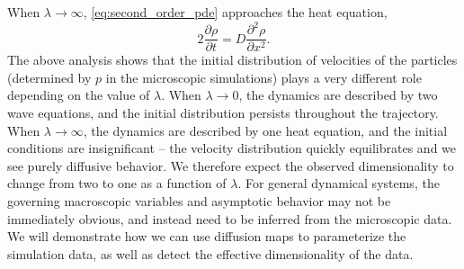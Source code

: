 \documentclass[preprint]{elsarticle}
\begin{document}
When $\lambda \rightarrow \infty$, \eqref{eq:second_order_pde} approaches the heat equation,
\begin{equation}
2 \frac{\partial \rho}{\partial t} = D \frac{\partial ^2 \rho}{\partial x^2}.
\end{equation}
%
%
The above analysis shows that the initial distribution of velocities of the particles (determined by $p$ in the microscopic simulations) plays a very different role depending on the value of $\lambda$.
%
When $\lambda \rightarrow 0$, the dynamics are described by two wave equations, and the initial distribution persists throughout the trajectory.
%
When $\lambda \rightarrow \infty$, the dynamics are described by one heat equation, and the initial conditions are insignificant -- the velocity distribution quickly equilibrates and we see purely diffusive behavior.
%
We therefore expect the observed dimensionality to change from two to one as a function of $\lambda$. 
%
For general dynamical systems, the governing macroscopic variables and asymptotic behavior may not be immediately obvious, and instead need to be inferred from the microscopic data.
%
We will demonstrate how we can use diffusion maps to parameterize the simulation data, as well as detect the effective dimensionality of the data.
%
%
%
%
\end{document}
